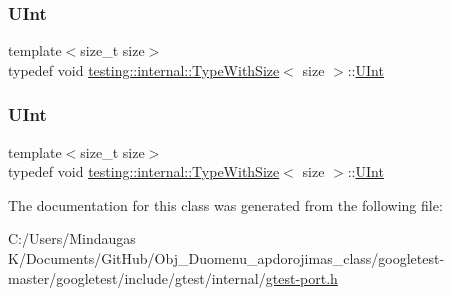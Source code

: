 \mbox{\label{classtesting_1_1internal_1_1_type_with_size_a3898640d9f6c1e18110eef90f47a5d7b}} 
\subsubsection{\texorpdfstring{UInt}{UInt}\hspace{0.1cm}{\footnotesize\ttfamily [2/3]}}
{\footnotesize\ttfamily template$<$size\+\_\+t size$>$ \\
typedef void \mbox{\hyperlink{classtesting_1_1internal_1_1_type_with_size}{testing\+::internal\+::\+Type\+With\+Size}}$<$ size $>$\+::\mbox{\hyperlink{classtesting_1_1internal_1_1_type_with_size_a3898640d9f6c1e18110eef90f47a5d7b}{U\+Int}}}

\mbox{\label{classtesting_1_1internal_1_1_type_with_size_a3898640d9f6c1e18110eef90f47a5d7b}} 
\subsubsection{\texorpdfstring{UInt}{UInt}\hspace{0.1cm}{\footnotesize\ttfamily [3/3]}}
{\footnotesize\ttfamily template$<$size\+\_\+t size$>$ \\
typedef void \mbox{\hyperlink{classtesting_1_1internal_1_1_type_with_size}{testing\+::internal\+::\+Type\+With\+Size}}$<$ size $>$\+::\mbox{\hyperlink{classtesting_1_1internal_1_1_type_with_size_a3898640d9f6c1e18110eef90f47a5d7b}{U\+Int}}}



The documentation for this class was generated from the following file\+:\begin{DoxyCompactItemize}
\item 
C\+:/\+Users/\+Mindaugas K/\+Documents/\+Git\+Hub/\+Obj\+\_\+\+Duomenu\+\_\+apdorojimas\+\_\+class/googletest-\/master/googletest/include/gtest/internal/\mbox{\hyperlink{googletest-master_2googletest_2include_2gtest_2internal_2gtest-port_8h}{gtest-\/port.\+h}}\end{DoxyCompactItemize}
